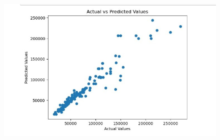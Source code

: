 \begin{figure}[h]
\centering
\footnotesize
\includegraphics[width=5in]{35.jpeg}
\label{fig:unevenlight}
\end{figure}  

